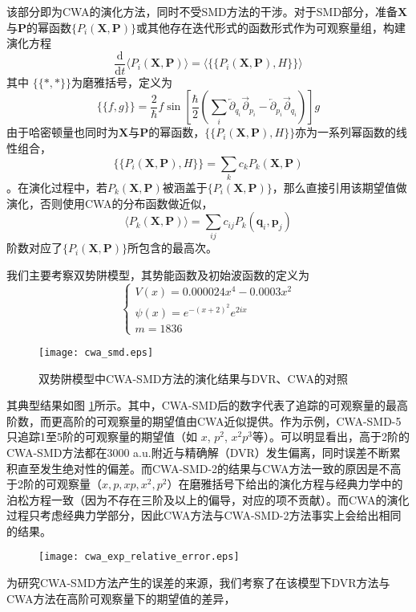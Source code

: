 该部分即为CWA的演化方法，同时不受SMD方法的干涉。对于SMD部分，准备$\boldsymbol{X}$与$\boldsymbol{P}$的幂函数$\{P_i(\boldsymbol{X},\boldsymbol{P})\}$或其他存在迭代形式的函数形式作为可观察量组，构建演化方程
\begin{equation}
\frac{\mathrm{d}}{\mathrm{d} t} \langle P_i(\boldsymbol{X},\boldsymbol{P}) \rangle = \langle \{\{P_i(\boldsymbol{X},\boldsymbol{P}), H\}\} \rangle
\end{equation}
其中 $\{\{ *, * \}\}$为磨雅括号，定义为
 \begin{equation}
	 \{\{f, g\}\}=\frac{2}{\hbar} f \sin \left[\frac{\hbar}{2}\left(\sum_{i} \overleftarrow{\partial}_{q_{i}} \overrightarrow{\partial}_{p_{i}}-\overleftarrow{\partial}_{p_{i}} \overrightarrow{\partial}_{q_{i}}\right)\right] g
\end{equation}
由于哈密顿量也同时为$\boldsymbol{X}$与$\boldsymbol{P}$的幂函数，$\{\{P_i(\boldsymbol{X},\boldsymbol{P}), H\}\}$亦为一系列幂函数的线性组合，
\begin{equation}
\{\{P_i(\boldsymbol{X},\boldsymbol{P}), H\}\} = \sum_k c_k P_k(\boldsymbol{X},\boldsymbol{P})
\end{equation}
。在演化过程中，若$P_k(\boldsymbol{X},\boldsymbol{P})$被涵盖于$\{P_i(\boldsymbol{X},\boldsymbol{P})\}$，那么直接引用该期望值做演化，否则使用CWA的分布函数做近似，
\begin{equation}
\langle P_k(\boldsymbol{X},\boldsymbol{P}) \rangle = \sum_{ij} c_{ij} P_k(\boldsymbol{q}_i,\boldsymbol{p}_j)
\end{equation}
阶数对应了$\{P_i(\boldsymbol{X},\boldsymbol{P})\}$所包含的最高次。

我们主要考察双势阱模型，其势能函数及初始波函数的定义为
\begin{equation}
\begin{cases}
V(x) = 0.000024 x^4 - 0.0003 x^2 \\
\psi(x) = e^{-(x+2)^2} e^{2ix} \\
m = 1836
\end{cases}
\end{equation}

\begin{figure}
\centering
\texttt{[image: cwa\_smd.eps]}
\caption{双势阱模型中CWA-SMD方法的演化结果与DVR、CWA的对照}
\label{cwa-smd-double-well}
\end{figure}
其典型结果如图 \ref{cwa-smd-double-well}所示。其中，CWA-SMD后的数字代表了追踪的可观察量的最高阶数，而更高阶的可观察量的期望值由CWA近似提供。作为示例，CWA-SMD-5只追踪1至5阶的可观察量的期望值（如 $x$, $p^2$, $x^2 p^3$等）。可以明显看出，高于2阶的CWA-SMD方法都在3000 a.u.附近与精确解（DVR）发生偏离，同时误差不断累积直至发生绝对性的偏差。而CWA-SMD-2的结果与CWA方法一致的原因是不高于2阶的可观察量（$x, p, xp, x^2, p^2$）在磨雅括号下给出的演化方程与经典力学中的泊松方程一致（因为不存在三阶及以上的偏导，对应的项不贡献）。而CWA的演化过程只考虑经典力学部分，因此CWA方法与CWA-SMD-2方法事实上会给出相同的结果。

\begin{figure}
\centering
\texttt{[image: cwa\_exp\_relative\_error.eps]}
\caption{}
\end{figure}
为研究CWA-SMD方法产生的误差的来源，我们考察了在该模型下DVR方法与CWA方法在高阶可观察量下的期望值的差异，



